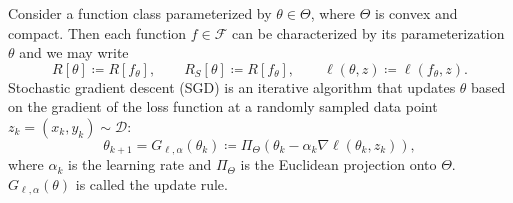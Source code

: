\documentclass{article}[12pt]
\def\F{\mathcal{F}}
\def\D{\mathcal{D}}
\begin{document}
Consider a function class parameterized by $\theta \in \Theta$, where $\Theta$ is convex and compact. Then each function $f \in \F$ can be characterized by its parameterization $\theta$ and we may write 
\[
   R[\theta] \coloneqq R[f_\theta], \qquad R_S[\theta] \coloneqq R[f_\theta], \qquad \ell(\theta, z) \coloneqq \ell(f_\theta, z).
\]
Stochastic gradient descent (SGD) is an iterative algorithm that updates $\theta$ based on the gradient of the loss function at a randomly sampled data point $z_k = (x_k, y_k) \sim \D$:
\begin{equation} \label{updaterule}
\theta_{k+1} = G_{\ell, \alpha}(\theta_k) \coloneqq \Pi_{\Theta} \left( \theta_k - \alpha_k \nabla \ell(\theta_k, z_k) \right), 
\end{equation}
where $\alpha_k$ is the learning rate and $\Pi_{\Theta}$ is the Euclidean projection onto $\Theta$. $G_{\ell, \alpha}(\theta)$ is called the update rule. 
\end{document}
